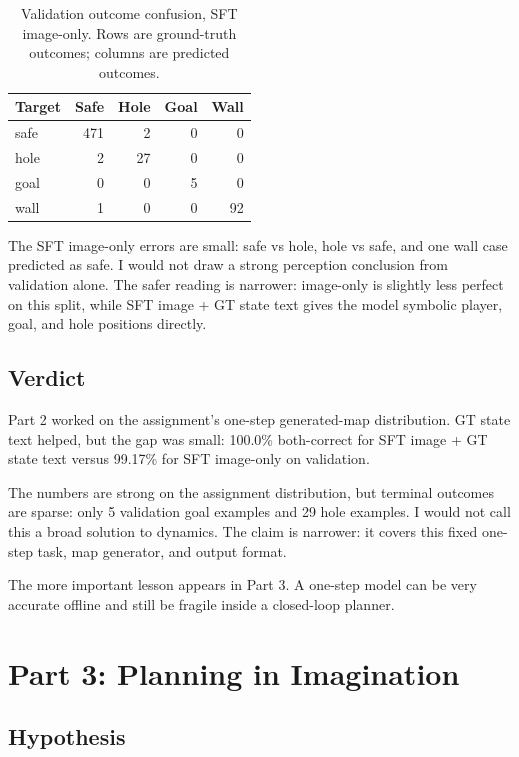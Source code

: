 \documentclass{article}
\begin{document}
\begin{table}[t]
\caption{Validation outcome confusion, SFT image-only. Rows are ground-truth outcomes; columns are predicted outcomes.}
\label{tab:confimage}
\centering
\small
\begin{tabular}{lrrrr}
\toprule
Target & Safe & Hole & Goal & Wall \\
\midrule
safe & 471 & 2 & 0 & 0 \\
hole & 2 & 27 & 0 & 0 \\
goal & 0 & 0 & 5 & 0 \\
wall & 1 & 0 & 0 & 92 \\
\bottomrule
\end{tabular}
\end{table}

The SFT image-only errors are small: safe vs hole, hole vs safe, and one wall case predicted as safe. I would not draw a strong perception conclusion from validation alone. The safer reading is narrower: image-only is slightly less perfect on this split, while SFT image + GT state text gives the model symbolic player, goal, and hole positions directly.

\subsection{Verdict}

Part 2 worked on the assignment's one-step generated-map distribution. GT state text helped, but the gap was small: 100.0\% both-correct for SFT image + GT state text versus 99.17\% for SFT image-only on validation.

The numbers are strong on the assignment distribution, but terminal outcomes are sparse: only 5 validation goal examples and 29 hole examples. I would not call this a broad solution to dynamics. The claim is narrower: it covers this fixed one-step task, map generator, and output format.

The more important lesson appears in Part 3. A one-step model can be very accurate offline and still be fragile inside a closed-loop planner.

\section{Part 3: Planning in Imagination}

\subsection{Hypothesis}
\end{document}
